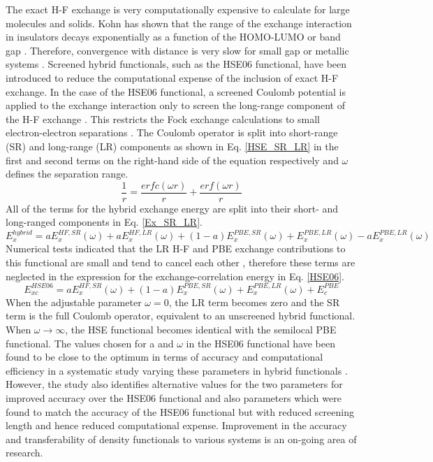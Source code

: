 \documentclass[11pt, twoside]{report}
\begin{document}
The exact H-F exchange is very computationally expensive to calculate for large molecules and solids. Kohn has shown that the range of the exchange interaction in insulators decays exponentially as a function of the HOMO-LUMO or band gap \cite{HSE_ref13}. Therefore, convergence with distance is very slow for small gap or metallic systems \cite{HSE}.
Screened hybrid functionals, such as the HSE06 functional, have been introduced to reduce the computational expense of the inclusion of exact H-F exchange. In the case of the HSE06 functional, a screened Coulomb potential is applied to the exchange interaction only to screen the long-range component of the H-F exchange \cite{HSE2}. This restricts the Fock exchange calculations to small electron-electron separations \cite{HSE_systematic}. The Coulomb operator is split into short-range (SR) and long-range (LR) components as shown in Eq. \ref{HSE_SR_LR} in the first and second terms on the right-hand side of the equation respectively and $\omega$ defines the separation range.
\begin{equation}\label{HSE_SR_LR}
\frac{1}{r} = \frac{erfc(\omega r)}{r} + \frac{erf(\omega r)}{r}
\end{equation}
All of the terms for the hybrid exchange energy are split into their short- and long-ranged components in Eq. \ref{Ex_SR_LR}.
\begin{equation}\label{Ex_SR_LR}
E_x^{hybrid} = aE_x^{HF,SR}(\omega) + aE_x^{HF,LR}(\omega) + (1-a)E_x^{PBE,SR}(\omega) + E_x^{PBE,LR}(\omega) - aE_x^{PBE,LR}(\omega)
\end{equation}
Numerical tests indicated that the LR H-F and PBE exchange contributions to this functional are small and tend to cancel each other \cite{HSE}, therefore these terms are neglected in the expression for the exchange-correlation energy in Eq. \ref{HSE06}.
\begin{equation}\label{HSE06}
E_{xc}^{HSE06} = aE_x^{HF,SR}(\omega) + (1-a)E_x^{PBE,SR}(\omega) + E_x^{PBE,LR}(\omega) + E_c^{PBE}
\end{equation}
When the adjustable parameter $\omega = 0$, the LR term becomes zero and the SR term is the full Coulomb operator, equivalent to an unscreened hybrid functional. When $\omega \rightarrow \infty $, the HSE functional becomes identical with the semilocal PBE functional. The values chosen for a and $\omega$ in the HSE06 functional have been found to be close to the optimum in terms of accuracy and computational efficiency in a systematic study varying these parameters in hybrid functionals \cite{HSE_systematic}. However, the study also identifies alternative values for the two parameters for improved accuracy over the HSE06 functional and also parameters which were found to match the accuracy of the HSE06 functional but with reduced screening length and hence reduced computational expense. Improvement in the accuracy and transferability of density functionals to various systems is an on-going area of research.
\end{document}

